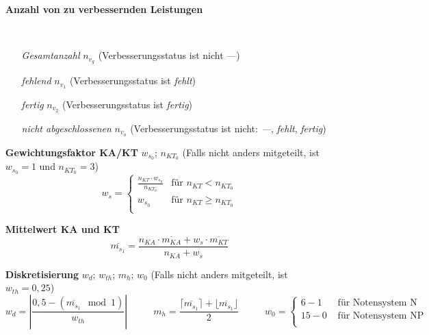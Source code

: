 \begin{enumerate}[label=\textbf{\textbullet}, align=left, leftmargin=*]
	\item[\textbf{Anzahl von zu verbessernden Leistungen}] { \scriptsize \mbox{} \
	\setlength{\columnsep}{-20pt}
	\begin{multicols}{2}
	\begin{enumerate}[label=\textbf{\textbullet}, align=left, leftmargin=*]
		\item[\textit{Gesamtanzahl}] $n_{v_g}$ (Verbesserungsstatus ist nicht \glqq ---\grqq{})
		\item[\textit{fehlend}] $n_{v_1}$ (Verbesserungsstatus ist \glqq \textit{fehlt}\grqq{})
		\item[\textit{fertig}] $n_{v_2}$ (Verbesserungsstatus ist \glqq \textit{fertig}\grqq{})
		\item[\textit{nicht abgeschlossenen}] $n_{v_o}$ (Verbesserungsstatus ist nicht: \glqq\textit{---}\grqq{}, \glqq\textit{fehlt}\grqq{}, \glqq\textit{fertig}\grqq{})
	\end{enumerate}
	\end{multicols}
	}
	\vspace*{-12pt}
	\item[\textbf{Gewichtungsfaktor KA/KT}] $w_{s_0}$; $n_{KT_0}$  (Falls nicht anders mitgeteilt, ist $w_{s_0}=1$ und $n_{KT_0}=3$)
	\[
	w_s =
	\begin{cases}
		\frac{n_{KT} \cdot w_{s_0}}{n_{KT_0}} & \text{für }    n_{KT} < n_{KT_0} \\
		w_{s_0} & \text{für }    n_{KT} \geq n_{KT_0} \\
	\end{cases}
	\]	
	\item[\textbf{Mittelwert KA und KT}] \vspace{-0.5cm}
	\[
	\overline{m_{s_1}} = \frac{ n_{KA} \cdot \overline{m_{KA}} + w_s \cdot \overline{m_{KT}} }{n_{KA} + w_s}
	\]
	\item[\textbf{Diskretisierung}] $w_{d}$; $w_{th}$; $m_h$; $w_{0}$ (Falls nicht anders mitgeteilt, ist $w_{th}=0{,}25$) \cite{wikigaussklammer,wikibetrag,wikimodulo}
	\[
	w_{d} = \left| \frac{0{,}5 - (\overline{m_{s_1}} \mod 1)}{w_{th}} \right|
	\,\hspace{1cm}\,
	m_{h} = \frac{\lceil \overline{m_{s_1}} \rceil + \lfloor \overline{m_{s_1}} \rfloor}{2}
	\,\hspace{1cm}\,
	w_{0} =
	\begin{cases}
		6-1 & \text{ für Notensystem N} \\
		15 - 0 & \text{ für Notensystem NP} \\
	\end{cases}
\]
\end{enumerate}
